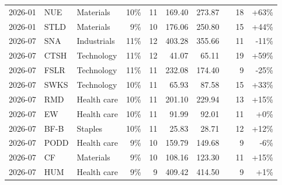 \documentclass[11pt,a4paper]{article}
\begin{document}
{\begin{longtable}{l l l r r r r r r r}
2026-01 & NUE & Materials & 10\% & 11 & 169.40 & 273.87 &  & 18 & +63\% \\
2026-01 & STLD & Materials & 9\% & 10 & 176.06 & 250.80 &  & 15 & +44\% \\
2026-07 & SNA & Industrials & 11\% & 12 & 403.28 & 355.66 &  & 11 & -11\% \\
2026-07 & CTSH & Technology & 11\% & 12 & 41.07 & 65.11 &  & 19 & +59\% \\
2026-07 & FSLR & Technology & 11\% & 11 & 232.08 & 174.40 &  & 9 & -25\% \\
2026-07 & SWKS & Technology & 10\% & 11 & 65.93 & 87.58 &  & 15 & +33\% \\
2026-07 & RMD & Health care & 10\% & 11 & 201.10 & 229.94 &  & 13 & +15\% \\
2026-07 & EW & Health care & 10\% & 11 & 91.99 & 92.01 &  & 11 & +0\% \\
2026-07 & BF-B & Staples & 10\% & 11 & 25.83 & 28.71 &  & 12 & +12\% \\
2026-07 & PODD & Health care & 9\% & 10 & 159.79 & 149.68 &  & 9 & -6\% \\
2026-07 & CF & Materials & 9\% & 10 & 108.16 & 123.30 &  & 11 & +15\% \\
2026-07 & HUM & Health care & 9\% & 9 & 409.42 & 414.50 &  & 9 & +1\% \\
\hline
\end{longtable}}
\end{document}
